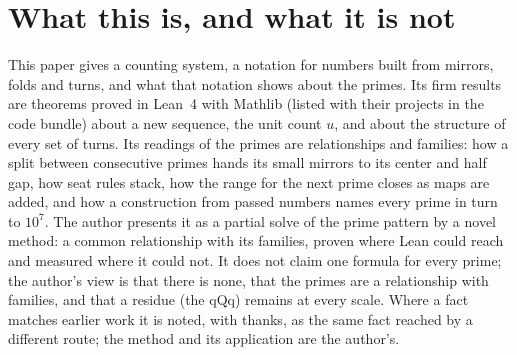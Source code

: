 \documentclass[11pt]{article}
\begin{document}
\begin{abstract}
hands its small mirrors to its center and half gap, the hop of walls and seat steps, the hierarchy of seat rules, even primes, offsets of eleven, nine and cubes, a construction that names every prime in turn up to $10^7$, two as the zero of the primes, and the wall law: a prime block $r = 6k_r+f_r$ closes the wing $f$ of wall $k$ exactly when $k\equiv f f_r k_r \pmod r$ (proven in Lean), the two-point law $u(c2^a+j) = u(c)v(2^a+j) - d(c)v(j)$, and an audit placing every claim as proven ($77$ of $141$, in one Lean library of $330$ theorems), checked, measured, definition or reading. Version 5.3 runs the wall law from $2$ and $3$ alone through every seat to $4.295\times10^9$ and to the last seats below $2^{64}$, exact throughout. Version 5.4 proves the wall walk exact at every size and raises the proven claims to $91$ of $141$, in one Lean library of $398$ theorems, with laws found by PySR and then proven. Version 5.5 adds one formula for the primes in wall coordinates, proven, and says plainly that it is a computation ($92$ of $142$ claims proven, $404$ theorems). Reference code and the Lean proofs are attached.
\end{abstract}

\section*{What this is, and what it is not}
This paper gives a counting system, a notation for numbers built from mirrors, folds and turns, and what that notation shows about the primes. Its firm results are theorems proved in Lean~4 with Mathlib (listed with their projects in the code bundle) about a new sequence, the unit count $u$, and about the structure of every set of turns. Its readings of the primes are relationships and families: how a split between consecutive primes hands its small mirrors to its center and half gap, how seat rules stack, how the range for the next prime closes as maps are added, and how a construction from passed numbers names every prime in turn to $10^7$. The author presents it as a partial solve of the prime pattern by a novel method: a common relationship with its families, proven where Lean could reach and measured where it could not. It does not claim one formula for every prime; the author's view is that there is none, that the primes are a relationship with families, and that a residue (the qQq) remains at every scale. Where a fact matches earlier work it is noted, with thanks, as the same fact reached by a different route; the method and its application are the author's.
\end{document}
